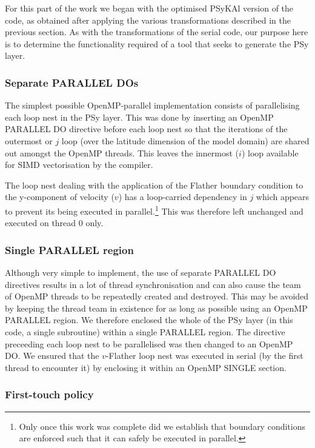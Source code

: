 \documentclass[gmd, manuscript]{copernicus}
\begin{document}
For this part of the work we began with the optimised {PS}y{KA}l
version of the code, as obtained after applying the various
transformations described in the previous section. As with the
transformations of the serial code, our purpose here is to determine
the functionality required of a tool that seeks to generate the PSy
layer.

\subsubsection{Separate PARALLEL DOs}
\label{sec_sep_dos}

The simplest possible OpenMP-parallel implementation consists of
parallelising each loop nest in the PSy layer. This was done by
inserting an OpenMP PARALLEL DO directive before each loop nest so
that the iterations of the outermost or $j$ loop (over the latitude
dimension of the model domain) are shared out amongst the OpenMP
threads. This leaves the innermost ($i$) loop available for SIMD
vectorisation by the compiler.

The loop nest dealing with the application of the Flather boundary
condition to the y-component of velocity ($v$) has a loop-carried
dependency in $j$ which appears to prevent its being executed in
parallel.\footnote{Only once this work was complete did we establish
  that boundary conditions are enforced such that it can safely be
  executed in parallel.}  This was therefore left unchanged and
executed on thread 0 only.

\subsubsection{Single PARALLEL region}
\label{sec_single_parallel}

Although very simple to implement, the use of separate PARALLEL DO
directives results in a lot of thread synchronisation and can also
cause the team of OpenMP threads to be repeatedly created and
destroyed. This may be avoided by keeping the thread team in existence
for as long as possible using an OpenMP PARALLEL region.  We therefore
enclosed the whole of the PSy layer (in this code, a single
subroutine) within a single PARALLEL region. The directive preceeding
each loop nest to be parallelised was then changed to an OpenMP DO. We
ensured that the $v$-Flather loop nest was executed in serial (by the
first thread to encounter it) by enclosing it within an OpenMP SINGLE
section.

\subsubsection{First-touch policy}
\label{sec_1sttouch}
\end{document}
